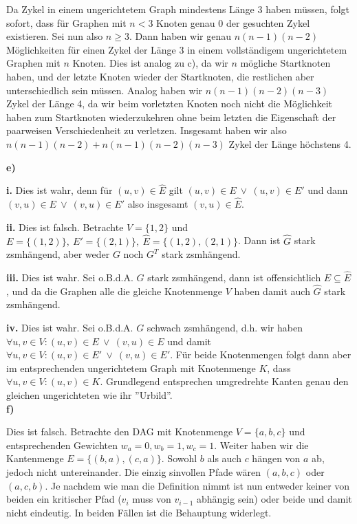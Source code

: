 \documentclass[a4paper,graphics,11pt]{article}
\begin{document}
Da Zykel in einem ungerichtetem Graph mindestens Länge 3 haben müssen, folgt sofort, dass für Graphen mit $n < 3$
Knoten genau 0 der gesuchten Zykel existieren. Sei nun also $n \geq 3$. Dann haben wir
genau $n(n-1)(n-2)$ Möglichkeiten für einen Zykel der Länge 3 in einem vollständigem ungerichtetem Graphen
mit $n$ Knoten. Dies ist analog zu c), da wir $n$ mögliche Startknoten haben, und der letzte Knoten wieder
der Startknoten, die restlichen aber unterschiedlich sein müssen. Analog haben wir $n(n-1)(n-2)(n-3)$
Zykel der Länge 4, da wir beim vorletzten Knoten noch nicht die Möglichkeit haben zum Startknoten wiederzukehren
ohne beim letzten die Eigenschaft der paarweisen Verschiedenheit zu verletzen.
Insgesamt haben wir also\\ $n(n-1)(n-2)+n(n-1)(n-2)(n-3)$ Zykel der Länge höchstens 4.

\newpage

\textbf{e)}

\textbf{i.}
Dies ist wahr, denn für $(u,v) \in \hat{E}$ gilt $(u,v) \in E\ \lor\ (u,v) \in E'$ und dann\\
$(v,u) \in E\ \lor\ (v,u) \in E'$ also insgesamt $(v,u) \in \hat{E}$.

\textbf{ii.}
Dies ist falsch. Betrachte $V = \{1,2\}$ und $E = \{(1,2)\},\ E' = \{(2,1)\},\ \hat{E} = \{(1,2),(2,1)\}$.
Dann ist $\hat{G}$ stark zsmhängend, aber weder $G$ noch $G^T$ stark zsmhängend.

\textbf{iii.}
Dies ist wahr. Sei o.B.d.A. $G$ stark zsmhängend, dann ist offensichtlich $E \subseteq \hat{E}$, und da
die Graphen alle die gleiche Knotenmenge $V$ haben damit auch $\hat{G}$ stark zsmhängend.

\textbf{iv.}
Dies ist wahr. Sei o.B.d.A. $G$ schwach zsmhängend, d.h. wir haben\\
$\forall u,v \in V: (u,v) \in E\ \lor\ (v,u) \in E$ und damit $\forall u,v \in V: (u,v) \in E'\ \lor\ (v,u) \in E'$. Für beide Knotenmengen
folgt dann aber im entsprechenden ungerichtetem Graph mit Knotenmenge $K$, dass
$\forall u,v \in V: (u,v) \in K$. Grundlegend entsprechen umgredrehte Kanten genau den gleichen ungerichteten wie
ihr ''Urbild''.\\

\textbf{f)}

Dies ist falsch. Betrachte den DAG mit Knotenmenge $V = \{a,b,c\}$ und entsprechenden Gewichten $w_a = 0, w_b = 1,
w_c = 1$.
Weiter haben wir die Kantenmenge $E = \{(b,a),(c,a)\}$. Sowohl $b$ als auch $c$ hängen von $a$ ab, jedoch
nicht untereinander. Die einzig sinvollen Pfade wären $(a,b,c)$ oder $(a,c,b)$. Je nachdem
wie man die Definition nimmt ist nun entweder keiner von beiden ein kritischer Pfad ($v_i$ muss von $v_{i-1}$ abhängig
sein) oder beide und damit nicht eindeutig. In beiden Fällen ist die Behauptung widerlegt.
\end{document}
